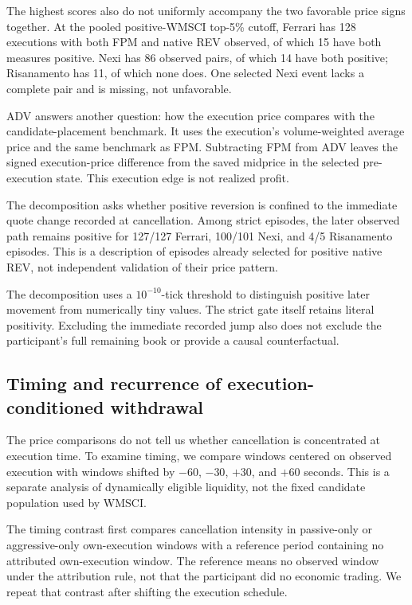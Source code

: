 \documentclass[11pt]{article}
\begin{document}
The highest scores also do not uniformly accompany the two favorable price signs together. At the pooled positive-WMSCI top-5\% cutoff, Ferrari has 128 executions with both FPM and native REV observed, of which 15 have both measures positive. Nexi has 86 observed pairs, of which 14 have both positive; Risanamento has 11, of which none does. One selected Nexi event lacks a complete pair and is missing, not unfavorable.

ADV answers another question: how the execution price compares with the candidate-placement benchmark. It uses the execution's volume-weighted average price and the same benchmark as FPM. Subtracting FPM from ADV leaves the signed execution-price difference from the saved midprice in the selected pre-execution state. This execution edge is not realized profit.

\FloatBarrier

The decomposition asks whether positive reversion is confined to the immediate quote change recorded at cancellation. Among strict episodes, the later observed path remains positive for 127/127 Ferrari, 100/101 Nexi, and 4/5 Risanamento episodes. This is a description of episodes already selected for positive native REV, not independent validation of their price pattern.

The decomposition uses a $10^{-10}$-tick threshold to distinguish positive later movement from numerically tiny values. The strict gate itself retains literal positivity. Excluding the immediate recorded jump also does not exclude the participant's full remaining book or provide a causal counterfactual.


\FloatBarrier

\subsection{Timing and recurrence of execution-conditioned withdrawal}
\label{subsec:timing_recurrence_results}

The price comparisons do not tell us whether cancellation is concentrated at execution time. To examine timing, we compare windows centered on observed execution with windows shifted by $-60$, $-30$, $+30$, and $+60$ seconds. This is a separate analysis of dynamically eligible liquidity, not the fixed candidate population used by WMSCI.

The timing contrast first compares cancellation intensity in passive-only or aggressive-only own-execution windows with a reference period containing no attributed own-execution window. The reference means no observed window under the attribution rule, not that the participant did no economic trading. We repeat that contrast after shifting the execution schedule.
\end{document}
